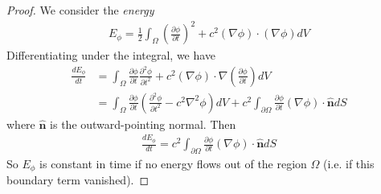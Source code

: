 \documentclass[a4paper]{article}
\begin{document}
\begin{proof}
We consider the \emph{energy}
\begin{equation*}
\begin{aligned}
E_\phi = \frac{1}{2} \int_\Omega \left(\frac{\partial \phi}{\partial t}\right)^2 + c^2 \left(\nabla \phi\right)\cdot\left(\nabla\phi\right)dV
\end{aligned}
\end{equation*}
Differentiating under the integral, we have
\begin{equation*}
\begin{aligned}
\frac{dE_\phi}{dt} &= \int_\Omega \frac{\partial \phi}{\partial t}\frac{\partial^2\phi}{\partial t^2} + c^2\left(\nabla\phi\right)\cdot\nabla\left(\frac{\partial \phi}{\partial t}\right) dV\\
&= \int_\Omega \frac{\partial \phi}{\partial t}\left(\frac{\partial^2 \phi}{\partial t^2} - c^2 \nabla^2 \phi\right) dV + c^2 \int_{\partial \Omega} \frac{\partial \phi}{\partial t}\left(\nabla\phi\right)\cdot\mathbf{\hat{n}} dS
\end{aligned}
\end{equation*}
where $\mathbf{\hat{n}}$ is the outward-pointing normal. Then
\begin{equation*}
\begin{aligned}
\frac{dE_\phi}{dt} = c^2 \int_{\partial \Omega} \frac{\partial \phi}{\partial t} \left(\nabla\phi\right)\cdot\mathbf{\hat{n}} dS
\end{aligned}
\end{equation*}
So $E_\phi$ is constant in time if no energy flows out of the region $\Omega$ (i.e. if this boundary term vanished).


\end{proof}
\end{document}
